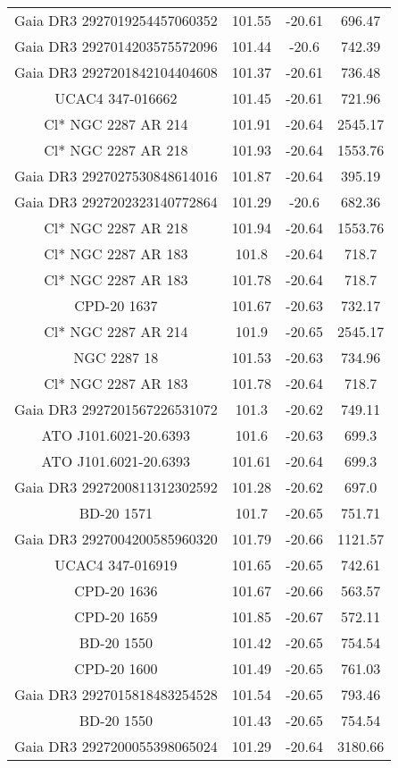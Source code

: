 \begin{table}
\begin{tabular}{cccc}
Gaia DR3 2927019254457060352 & 101.55 & -20.61 & 696.47 \\
Gaia DR3 2927014203575572096 & 101.44 & -20.6 & 742.39 \\
Gaia DR3 2927201842104404608 & 101.37 & -20.61 & 736.48 \\
UCAC4 347-016662 & 101.45 & -20.61 & 721.96 \\
Cl* NGC 2287     AR     214 & 101.91 & -20.64 & 2545.17 \\
Cl* NGC 2287     AR     218 & 101.93 & -20.64 & 1553.76 \\
Gaia DR3 2927027530848614016 & 101.87 & -20.64 & 395.19 \\
Gaia DR3 2927202323140772864 & 101.29 & -20.6 & 682.36 \\
Cl* NGC 2287     AR     218 & 101.94 & -20.64 & 1553.76 \\
Cl* NGC 2287     AR     183 & 101.8 & -20.64 & 718.7 \\
Cl* NGC 2287     AR     183 & 101.78 & -20.64 & 718.7 \\
CPD-20  1637 & 101.67 & -20.63 & 732.17 \\
Cl* NGC 2287     AR     214 & 101.9 & -20.65 & 2545.17 \\
NGC  2287    18 & 101.53 & -20.63 & 734.96 \\
Cl* NGC 2287     AR     183 & 101.78 & -20.64 & 718.7 \\
Gaia DR3 2927201567226531072 & 101.3 & -20.62 & 749.11 \\
ATO J101.6021-20.6393 & 101.6 & -20.63 & 699.3 \\
ATO J101.6021-20.6393 & 101.61 & -20.64 & 699.3 \\
Gaia DR3 2927200811312302592 & 101.28 & -20.62 & 697.0 \\
BD-20  1571 & 101.7 & -20.65 & 751.71 \\
Gaia DR3 2927004200585960320 & 101.79 & -20.66 & 1121.57 \\
UCAC4 347-016919 & 101.65 & -20.65 & 742.61 \\
CPD-20  1636 & 101.67 & -20.66 & 563.57 \\
CPD-20  1659 & 101.85 & -20.67 & 572.11 \\
BD-20  1550 & 101.42 & -20.65 & 754.54 \\
CPD-20  1600 & 101.49 & -20.65 & 761.03 \\
Gaia DR3 2927015818483254528 & 101.54 & -20.65 & 793.46 \\
BD-20  1550 & 101.43 & -20.65 & 754.54 \\
Gaia DR3 2927200055398065024 & 101.29 & -20.64 & 3180.66 \\

\end{tabular}
\end{table}
